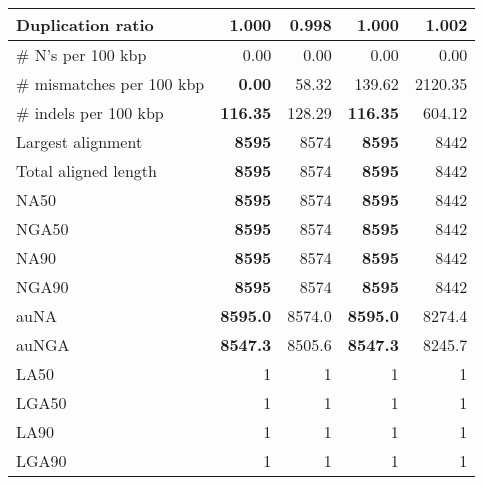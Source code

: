 \documentclass[12pt,a4paper]{article}
\begin{document}
\begin{table}[ht]
\begin{center}
\begin{tabular}{|l*{4}{|r}|}
Duplication ratio & 1.000 & {\bf 0.998} & 1.000 & 1.002 \\ \hline
\# N's per 100 kbp & 0.00 & 0.00 & 0.00 & 0.00 \\ \hline
\# mismatches per 100 kbp & {\bf 0.00} & 58.32 & 139.62 & 2120.35 \\ \hline
\# indels per 100 kbp & {\bf 116.35} & 128.29 & {\bf 116.35} & 604.12 \\ \hline
Largest alignment & {\bf 8595} & 8574 & {\bf 8595} & 8442 \\ \hline
Total aligned length & {\bf 8595} & 8574 & {\bf 8595} & 8442 \\ \hline
NA50 & {\bf 8595} & 8574 & {\bf 8595} & 8442 \\ \hline
NGA50 & {\bf 8595} & 8574 & {\bf 8595} & 8442 \\ \hline
NA90 & {\bf 8595} & 8574 & {\bf 8595} & 8442 \\ \hline
NGA90 & {\bf 8595} & 8574 & {\bf 8595} & 8442 \\ \hline
auNA & {\bf 8595.0} & 8574.0 & {\bf 8595.0} & 8274.4 \\ \hline
auNGA & {\bf 8547.3} & 8505.6 & {\bf 8547.3} & 8245.7 \\ \hline
LA50 & 1 & 1 & 1 & 1 \\ \hline
LGA50 & 1 & 1 & 1 & 1 \\ \hline
LA90 & 1 & 1 & 1 & 1 \\ \hline
LGA90 & 1 & 1 & 1 & 1 \\ \hline
\end{tabular}
\end{center}
\end{table}
\end{document}
